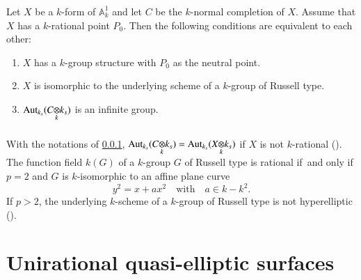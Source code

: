\subsubsection{}\label{chap3:1.6.2}
\begin{lemma*}
  Let $X$ be a $k$-form of $\mathbb{A}^{1}_{k}$ and let $C$ be the
  $k$-normal completion of $X$. Assume that $X$ has a $k$-rational point
  $P_{0}$. Then the following conditions are equivalent to each other:
  \begin{enumerate}
    \renewcommand{\theenumi}{\roman{enumi}}
    \renewcommand{\labelenumi}{\rm(\theenumi)}
  \item  $X$ has a $k$-group structure with $P_{0}$ as the neutral
    point.
    
  \item $X$ is isomorphic to the underlying scheme of a $k$-group of
    Russell type.
    
  \item $\Aut_{k_{s}}(\foprod{C}{k_{s}}{k})$ is an infinite group.
  \end{enumerate}
\end{lemma*}

\subsubsection{}\label{chap3:1.6.3}
\begin{remark*}
  With the notations of \ref{chap3:1.6.2},
  $\Aut_{k_{s}}(\foprod{C}{k_{s}}{k})=\Aut_{k_{s}}(\foprod{X}{k_{s}}{k})$
  if $X$ is not $k$-rational (\cf [27; 3.1.1]). The function field
  $k(G)$ of a $k$-group $G$ of Russell type is rational if\pageoriginale\
  and only if $p=2$ and $G$ is $k$-isomorphic to an affine plane curve
  $$
  y^{2}=x+ax^{2}\quad\text{with}\quad a\in k-k^{2}.
  $$
  If $p>2$, the underlying $k$-scheme of a $k$-group of Russell type is
  not hyperelliptic (\cf [27; Cor.\@ 3.3.2]).
\end{remark*}

\section{Unirational quasi-elliptic surfaces}\label{chap3:chap3-sec2}\pageoriginale\

\subsection{}\label{chap3:2.1}

